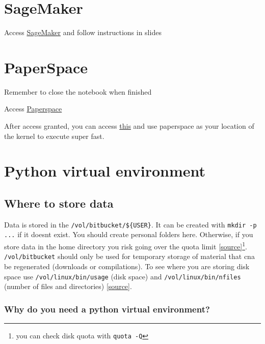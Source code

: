 \documentclass[11pt]{article}
\begin{document}
\section{SageMaker}

Access \href{https://studiolab.sagemaker.aws/}{SageMaker} and follow instructions in slides

\section{PaperSpace}

\begin{warning}
    Remember to close the notebook when finished
\end{warning}

Access \href{https://console.paperspace.com/login}{Paperspace}

After access granted, you can access \href{https://docs.paperspace.com/gradient/notebooks/notebooks-remote-kernel/}{this} and use paperspace as your location of the kernel to execute super fast.  

\section{Python virtual environment} \label{sect:python-venv}

\subsection{Where to store data}

Data is stored in the \verb|/vol/bitbucket/${USER}|. It can be created with \verb|mkdir -p ...| if it doesnt exist. You should create personal folders here. Otherwise, if you store data in the home directory you risk going over the quota limit \href{https://www.imperial.ac.uk/computing/people/csg/guides/python/virtual-environment/#d.en.1235829}{[source]}\footnote{you can check disk quota with \texttt{quota -Q}}. \texttt{/vol/bitbucket} should only be used for temporary storage of material that cna be regenerated (downloads or compilations). To see where you are storing disk space use \texttt{/vol/linux/bin/usage} (disk space) and \texttt{/vol/linux/bin/nfiles} (number of files and directories) \href{https://www.imperial.ac.uk/computing/people/csg/guides/python/virtual-environment/#d.en.1235829}{[source]}.

\subsubsection{Why do you need a python virtual environment?}
\end{document}
